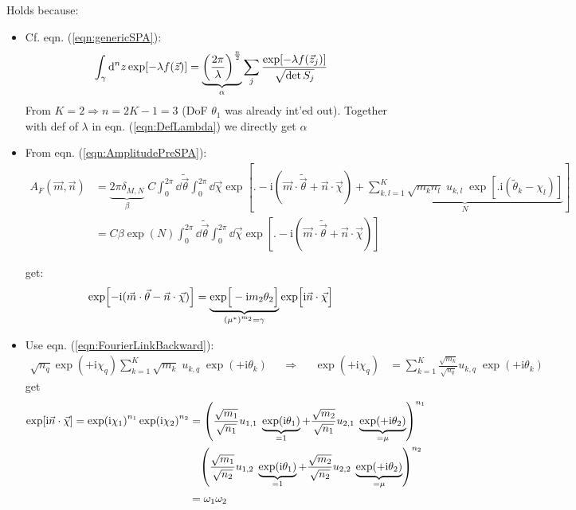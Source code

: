 \documentclass[
	english,
	a4paper,
	fontsize=10pt,
	parskip=half,
	titlepage=true,
	DIV=12,
	final
]{scrreprt}
\newcommand*{\Thus}{\ensuremath{\Rightarrow}\xspace}
\newcommand*{\iunit}{\ensuremath{\mathrm{i}}}
\newcommand*{\equalCond}{  \mathop{=}\limits^!  }
\begin{document}
Holds because:
\begin{itemize}
\item Cf. eqn. (\ref{eqn:genericSPA}):
\begin{align*}
	\int_{\gamma} \dd[n]{z}
		\exp[-\lambda f(\vec{z})]
&=
	\underbrace{
		\qty(
			\frac{2\pi}{\lambda}
		)^{\frac{n}{2}}
	}_{\alpha}
	\sum_j
		\frac
		{\exp[-\lambda f(\vec{z}_j)]}
		{\sqrt{\det S_j}}
\end{align*}
From $K=2 \Thus n=2K-1 = 3$ (DoF $\theta_1$ was already int'ed out). Together with def of 
	$\lambda$ in eqn. (\ref{eqn:DefLambda}) we directly get $\alpha$

\item From eqn. (\ref{eqn:AmplitudePreSPA}):
\begin{align*}
	A_F(\vec{m}, \vec{n})
&=
	\underbrace{2 \pi \delta_{M, N}}_{\beta} \; C
	\int_{0}^{2\pi} \dd{\tilde{\vec{\theta}}}
	\int_{0}^{2\pi} \dd{\vec{\chi}} 
		\exp[ \Bigg. -\iunit(\vec{m} \cdot \tilde{\vec{\theta}}  +  \vec{n} \cdot \vec{\chi}) 
		+
		\underbrace{
			\sum_{k,l=1}^{K} \sqrt{m_k n_l} \; u_{k,l} \; 
				\exp[ \Big. \iunit(\tilde{\theta}_k - \chi_l)] 
		}_{N}
		]
	\\
&=
	C \beta
	\exp(N)
	\int_{0}^{2\pi} \dd{\tilde{\vec{\theta}}}
	\int_{0}^{2\pi} \dd{\vec{\chi}} 
		\exp[
			\Big. -\iunit(\vec{m} \cdot \tilde{\vec{\theta}}  +  \vec{n} \cdot \vec{\chi}) 
		]
\end{align*}

get:
\begin{align}
	\exp[
		-
		\iunit(\vec{m} \cdot \vec{\theta} - \vec{n} \cdot \vec{\chi})
	]
&=
	\underbrace{ \exp[ \Big. -\iunit m_2 \theta_2] }_{\qty(\mu^{*})^{m_2} = \gamma}
	\exp[ \Big. \iunit \vec{n} \cdot \vec{\chi} ]
\end{align}

\item Use eqn. (\ref{eqn:FourierLinkBackward}):
\begin{align*}
	\sqrt{n_q} \exp(+\iunit \chi_q)
	\sum_{k=1}^{K}
	\sqrt{m_k} \; u_{k,q} \; \exp(+\iunit\theta_k)
%
&&\Thus&&
%
	\exp(+\iunit \chi_q)
&=
	\sum_{k=1}^{K}
		\frac{\sqrt{m_k}}{\sqrt{n_q}}
		u_{k,q} \; \exp(+\iunit\theta_k)
\end{align*}
get
\begin{align}
\nonumber
	\exp[ \iunit \vec{n} \cdot \vec{\chi} ]
=
	\exp( \iunit \chi_1 )^{n_1} \exp( \iunit \chi_2 )^{n_2}
&=
	\qty(
		\frac{\sqrt{m_1}}{\sqrt{n_1}}
		u_{1,1} \;
		\underbrace{ \exp(\iunit\theta_1) }_{=1}
		+
		\frac{\sqrt{m_2}}{\sqrt{n_1}}
		u_{2,1} \;
		\underbrace{ \exp(+\iunit\theta_2) }_{= \mu}
	)^{n_1} \\
	& \quad
	\qty(
		\frac{\sqrt{m_1}}{\sqrt{n_2}}
		u_{1,2} \;
		\underbrace{ \exp(\iunit\theta_1) }_{=1}
		+
		\frac{\sqrt{m_2}}{\sqrt{n_2}}
		u_{2,2} \;
		\underbrace{ \exp(+\iunit\theta_2) }_{= \mu}
	)^{n_2} \\
&=
	\omega_1 \omega_2
\end{align}
\end{itemize}
\end{document}
